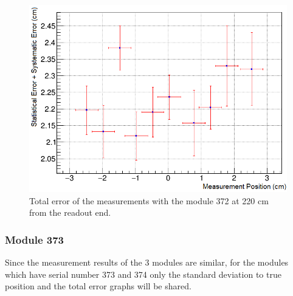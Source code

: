 \documentclass[a4paper]{article}\linespread{1.4}
\begin{document}
\begin{figure}[h!] \hspace*{-0cm} \includegraphics[width=120mm,scale=2.0]{figures/72fe.png} \caption{Total error of the measurements with the module 372 at 220 cm from the readout end.}  \label{fig:72fe}\end{figure}

\subsubsection{Module 373} 
Since the measurement results of the 3 modules are similar, for the modules which have serial number 373 and 374 only the standard deviation to true position and the total error graphs will be shared.
\end{document}
